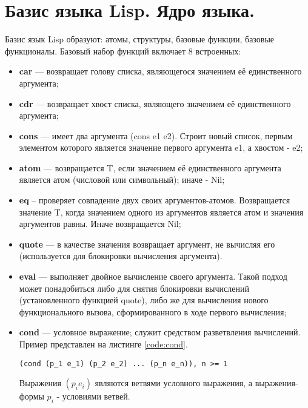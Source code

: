 \section{Базис языка Lisp. Ядро языка.}
Базис язык Lisp образуют: атомы, структуры, базовые функции, базовые функционалы.
Базовый набор функций включает 8 встроенных:
\begin{itemize}
	\item \textbf{car} --- возвращает голову списка, являющегося значением её единственного аргумента;
	\item \textbf{cdr} --- возвращает хвост списка, являющего значением её единственного аргумента;
	\item \textbf{cons} --- имеет два аргумента (cons e1 e2). Строит новый список, первым элементом которого является значение первого аргумента e1, а хвостом - e2;
	\item \textbf{atom} --- возвращается T, если значением её единственного аргумента является атом (числовой или символьный); иначе - Nil;
	\item \textbf{eq} -- проверяет совпадение двух своих аргументов-атомов. Возвращается значение T, когда значением одного из аргументов является атом и значения аргументов равны. Иначе возвращается Nil;
	\item \textbf{quote} --- в качестве значения возвращает аргумент, не вычисляя его (используется для блокировки вычисления аргумента).
	\item \textbf{eval} --- выполняет двойное вычисление своего аргумента. Такой подход может понадобиться либо для снятия блокировки вычислений (установленного функцией quote), либо же для вычисления нового функционального вызова, сформированного в ходе первого вычисления;
	\item \textbf{cond} --- условное выражение; служит средством разветвления вычислений. Пример представлен на листинге \ref{code:cond}.

	\begin{lstlisting}[label=code:cond, caption = Вызов функции cond.]
	(cond (p_1 e_1) (p_2 e_2) ... (p_n e_n)), n >= 1
	\end{lstlisting}

	Выражения $(p_i e_i)$ являются ветвями условного выражения, а выражения-формы $p_i$ - условиями ветвей.
	
\end{itemize} 
